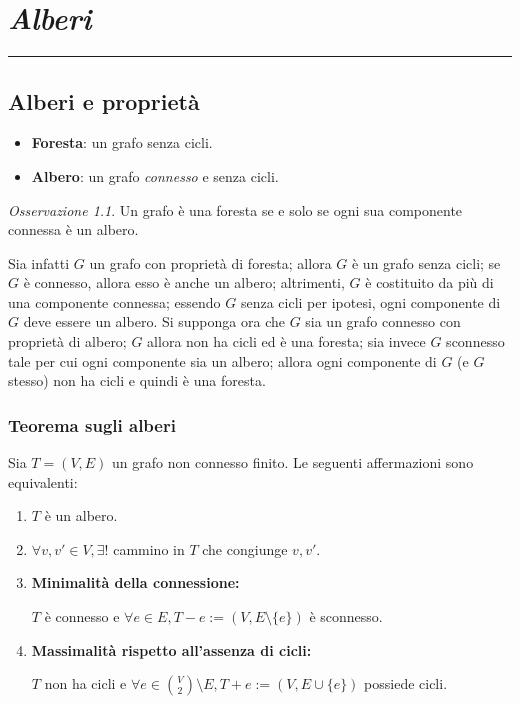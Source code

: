\documentclass[oneside]{book}
\newcommand{\chptr}[1]{\chapter{\textit{#1}}\noindent\rule{\textwidth}{1pt}}
\theoremstyle{remark}
\newtheorem*{osservaz}{Osservazione}
\begin{document}
\chptr{Alberi}

\section{Alberi e proprietà}

\begin{tcolorbox}[colback=yellow!30, colframe=yellow!30!black, title = {Alberi e Foreste}]
\begin{itemize}
    \item \textbf{Foresta}: un grafo senza cicli.
    \item \textbf{Albero}: un grafo \textit{connesso} e senza cicli.
\end{itemize}
\end{tcolorbox}

\begin{osservaz}
Un grafo è una foresta se e solo se ogni sua componente connessa è un albero.

Sia infatti $G$ un grafo con proprietà di foresta; allora $G$ è un grafo senza
cicli; se $G$ è connesso, allora esso è anche un albero; altrimenti, $G$ è
costituito da più di una componente connessa; essendo $G$ senza cicli per
ipotesi, ogni componente di $G$ deve essere un albero. Si supponga ora che
$G$ sia un grafo connesso con proprietà di albero; $G$ allora non ha cicli
ed è una foresta; sia invece $G$ sconnesso tale per cui ogni componente
sia un albero; allora ogni componente di $G$ (e $G$ stesso) non ha cicli
e quindi è una foresta.
\end{osservaz}

\subsection*{Teorema sugli alberi}
Sia $T=(V,E)$ un grafo non connesso finito. Le seguenti affermazioni
sono equivalenti:
\begin{enumerate}
\item $T$ è un albero.
\item $\forall v,v'\in V, \exists!$ cammino in $T$ che congiunge $v,v'$.
\item \textbf{Minimalità della connessione:}

$T$ è connesso e $\forall e\in E, T-e:=(V,E\setminus \{e\})$ è sconnesso.


\item \textbf{Massimalità rispetto all'assenza di cicli:}

$T$ non ha cicli e $\forall e \in \binom{V}{2}\setminus E, T+e:=(V,E\cup\{e\})$ possiede cicli.
\end{enumerate}
\end{document}
